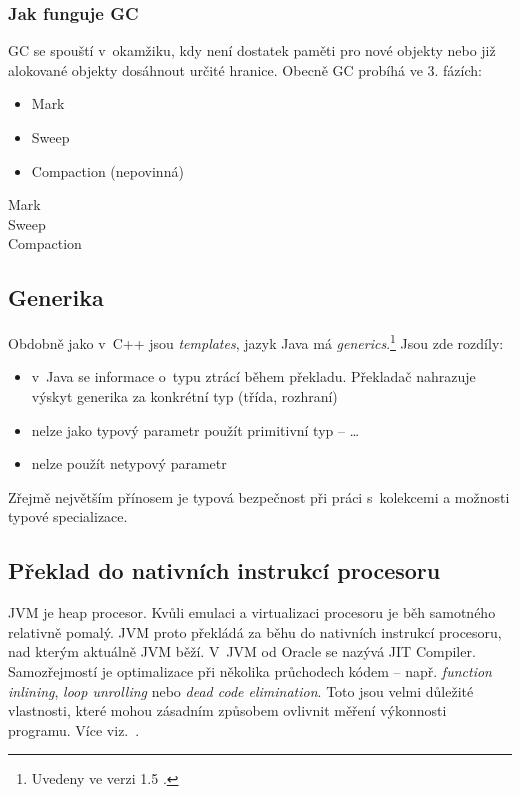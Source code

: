 \subsubsection{Jak funguje GC}
GC se spouští v~okamžiku, kdy není dostatek paměti pro nové objekty nebo již alokované objekty dosáhnout určité hranice. Obecně GC probíhá ve 3. fázích:
\begin{itemize}
  \item Mark
  \item Sweep
  \item Compaction (nepovinná)
\end{itemize}

\begin{description}
  \item[Mark] 
  \item[Sweep] 
  \item[Compaction]
\end{description}

\subsection{Generika\label{sub:generika}}

Obdobně jako v~C++ jsou \emph{templates}\cite{ISO:2012:CPP}, jazyk Java má \emph{generics}.\footnote{Uvedeny ve verzi 1.5 \cite{gosling2013java}.}
Jsou zde rozdíly:
\begin{itemize}
  \item v~Java se informace o~typu ztrácí během překladu. Překladač nahrazuje výskyt generika za konkrétní typ (třída, rozhraní)
  \item nelze jako typový parametr použít primitivní typ --  \ldots{}
  \item nelze použít netypový parametr
\end{itemize}

Zřejmě největším přínosem je typová bezpečnost při práci s~kolekcemi a možnosti typové specializace.

\subsection{Překlad \bytecode{} do nativních instrukcí procesoru}

JVM je heap procesor. Kvůli emulaci a virtualizaci procesoru je
běh samotného \bytecode{} relativně pomalý. JVM proto překládá
za běhu \bytecode{} do nativních instrukcí procesoru, nad kterým
aktuálně JVM běží. V~JVM od Oracle
 se nazývá JIT Compiler\cite{hunt2011java}. Samozřejmostí je optimalizace při několika průchodech
kódem -- např. \emph{function inlining}, \emph{loop unrolling} nebo \emph{dead code elimination}\cite{hunt2011java}. Toto jsou velmi důležité vlastnosti, které mohou zásadním způsobem
ovlivnit měření výkonnosti programu. Více viz.~.


